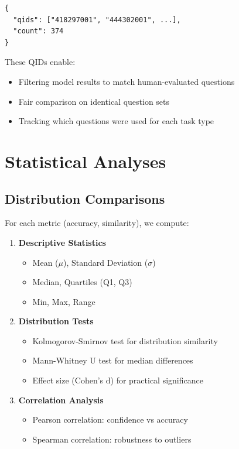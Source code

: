 \documentclass{article}
\begin{document}
\begin{verbatim}
{
  "qids": ["418297001", "444302001", ...],
  "count": 374
}
\end{verbatim}

These QIDs enable:
\begin{itemize}
    \item Filtering model results to match human-evaluated questions
    \item Fair comparison on identical question sets
    \item Tracking which questions were used for each task type
\end{itemize}

\section{Statistical Analyses}

\subsection{Distribution Comparisons}

For each metric (accuracy, similarity), we compute:

\begin{enumerate}
    \item \textbf{Descriptive Statistics}
    \begin{itemize}
        \item Mean ($\mu$), Standard Deviation ($\sigma$)
        \item Median, Quartiles (Q1, Q3)
        \item Min, Max, Range
    \end{itemize}

    \item \textbf{Distribution Tests}
    \begin{itemize}
        \item Kolmogorov-Smirnov test for distribution similarity
        \item Mann-Whitney U test for median differences
        \item Effect size (Cohen's d) for practical significance
    \end{itemize}

    \item \textbf{Correlation Analysis}
    \begin{itemize}
        \item Pearson correlation: confidence vs accuracy
        \item Spearman correlation: robustness to outliers
    \end{itemize}
\end{enumerate}
\end{document}
